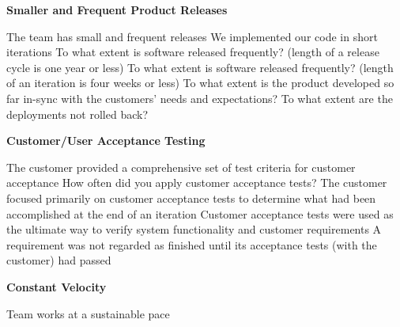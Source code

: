 \textbf{Smaller and Frequent Product Releases}
\begin{itemize}
	\taa The team has small and frequent releases
	\pam We implemented our code in short iterations
	\ops To what extent is software released frequently? (length of a release cycle is one year or less)
	\ops To what extent is software released frequently? (length of an iteration is four weeks or less)
	\ops To what extent is the product developed so far in-sync with the customers' needs and expectations? 
	\ops To what extent are the deployments not rolled back? 
\end{itemize}

\textbf{Customer/User Acceptance Testing}
\begin{itemize}
	\pam The customer provided a comprehensive set of test criteria for customer acceptance %
	\pam How often did you apply customer acceptance tests? %
	\pam The customer focused primarily on customer acceptance tests to determine what had been accomplished at the end of an iteration %
	\pam Customer acceptance tests were used as the ultimate way to verify system functionality and customer requirements %
	\pam A requirement was not regarded as finished until its acceptance tests (with the customer) had passed %
\end{itemize}

\textbf{Constant Velocity}
\begin{itemize}
	\taa Team works at a sustainable pace %
\end{itemize}

